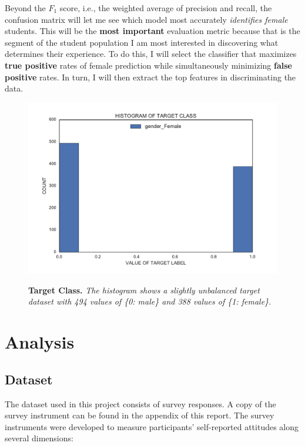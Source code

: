 Beyond the $F_1$ score, i.e., the weighted average of precision and recall, the confusion matrix will let me see which model most accurately \emph{identifies female} students. This will be the \textbf{most important} evaluation metric because that is the segment of the student population I am most interested in discovering what determines their experience. To do this, I will select the classifier that maximizes \textbf{true positive} rates of female prediction while simultaneously minimizing \textbf{false positive} rates. In turn, I will then extract the top features in discriminating the data. 

\begin{figure}[!hbtp]
\centering

    \caption{\textbf{Target Class. }\textit{The histogram shows a slightly unbalanced target dataset with 494 values of \{0: male\} and 388 values of \{1: female\}.}}

    \includegraphics[width=1\textwidth]{figures/targetClass}
    \label{targetClass}
\end{figure}


\chapter*{Analysis}

\section* {Dataset}
The dataset used in this project consists of survey responses. A copy of the survey instrument can be found in the appendix of this report. The survey instruments were developed to measure participants' self-reported attitudes along several dimensions: 

